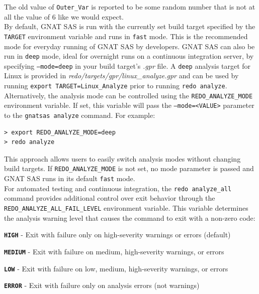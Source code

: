 The old value of \texttt{Outer\_Var} is reported to be some random number that is not at all the value of 6 like we would expect. \\

By default, GNAT SAS is run with the currently set build target specified by the \texttt{TARGET} environment variable and runs in \texttt{fast} mode. This is the recommended mode for everyday running of GNAT SAS by developers. GNAT SAS can also be run in \texttt{deep} mode, ideal for overnight runs on a continuous integration server, by specifying \texttt{---mode=deep} in your build target's \textit{.gpr} file. A \texttt{deep} analysis target for Linux is provided in \textit{redo/targets/gpr/linux\_analyze.gpr} and can be used by running \texttt{export TARGET=Linux\_Analyze} prior to running \texttt{redo analyze}. \\

Alternatively, the analysis mode can be controlled using the \texttt{REDO\_ANALYZE\_MODE} environment variable. If set, this variable will pass the \texttt{---mode=<VALUE>} parameter to the \texttt{gnatsas analyze} command. For example:

\vspace{5mm} %
\begin{verbatim}
> export REDO_ANALYZE_MODE=deep
> redo analyze
\end{verbatim}
\vspace{5mm} %

This approach allows users to easily switch analysis modes without changing build targets. If \texttt{REDO\_ANALYZE\_MODE} is not set, no mode parameter is passed and GNAT SAS runs in its default \texttt{fast} mode. \\

For automated testing and continuous integration, the \texttt{redo analyze\_all} command provides additional control over exit behavior through the \texttt{REDO\_ANALYZE\_ALL\_FAIL\_LEVEL} environment variable. This variable determines the analysis warning level that causes the command to exit with a non-zero code:

\vspace{5mm} %
\begin{spaceditemize}
  \item \textbf{\texttt{HIGH}} - Exit with failure only on high-severity warnings or errors (default)
  \item \textbf{\texttt{MEDIUM}} - Exit with failure on medium, high-severity warnings, or errors  
  \item \textbf{\texttt{LOW}} - Exit with failure on low, medium, high-severity warnings, or errors
  \item \textbf{\texttt{ERROR}} - Exit with failure only on analysis errors (not warnings)
\end{spaceditemize}
\vspace{5mm} %


